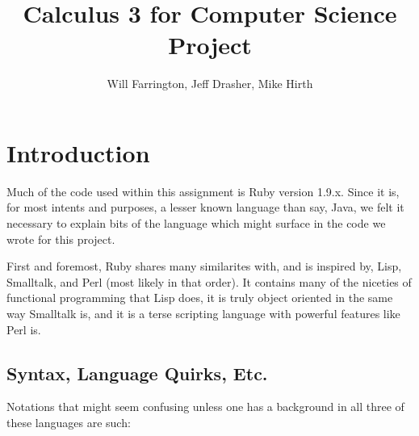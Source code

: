 \documentclass[letterpaper,11pt]{article}
\author{Will Farrington, Jeff Drasher, Mike Hirth}
\title{Calculus 3 for Computer Science Project}
\begin{document}
\maketitle
\tableofcontents
\newpage
\section{Introduction}

Much of the code used within this assignment is Ruby version 1.9.x.
Since it is, for most intents and purposes, a lesser known language than say, Java,
we felt it necessary to explain bits of the language which might surface in the code
we wrote for this project.

First and foremost, Ruby shares many similarites with, and is inspired by, Lisp, Smalltalk, and Perl (most likely in that order).
It contains many of the niceties of functional programming that Lisp does,
it is truly object oriented in the same way Smalltalk is,
and it is a terse scripting language with powerful features like Perl is.

\subsection{Syntax, Language Quirks, Etc.}

Notations that might seem confusing unless one has a background in all three of these languages are such:
\end{document}
